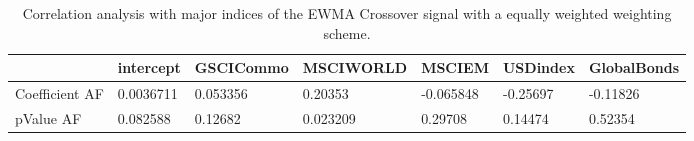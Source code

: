 \begin{table}[H]
\centering
\begin{tabular}{lllllll}
& intercept & GSCICommo & MSCIWORLD & MSCIEM & USDindex & GlobalBonds \\ 
\hline 
Coefficient AF & 0.0036711 & 0.053356 & 0.20353 & -0.065848 & -0.25697 & -0.11826 \\ 
pValue AF & 0.082588 & 0.12682 & 0.023209 & 0.29708 & 0.14474 & 0.52354 \\ 
\hline
\end{tabular}
\caption{Correlation analysis with major indices of the EWMA Crossover signal with a equally weighted weighting scheme.}
\label{MBBSEWOQ_AFACTOR}
\end{table}